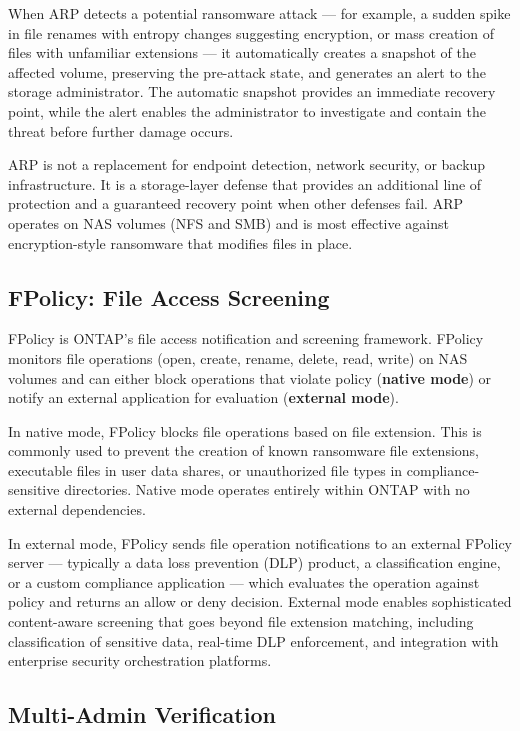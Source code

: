 \begin{securitybox}
When ARP detects a potential ransomware attack --- for example, a sudden spike in file renames with entropy changes suggesting encryption, or mass creation of files with unfamiliar extensions --- it automatically creates a snapshot of the affected volume, preserving the pre-attack state, and generates an alert to the storage administrator. The automatic snapshot provides an immediate recovery point, while the alert enables the administrator to investigate and contain the threat before further damage occurs.

ARP is not a replacement for endpoint detection, network security, or backup infrastructure. It is a storage-layer defense that provides an additional line of protection and a guaranteed recovery point when other defenses fail. ARP operates on NAS volumes (NFS and SMB) and is most effective against encryption-style ransomware that modifies files in place.

\subsection*{FPolicy: File Access Screening}

FPolicy is ONTAP's file access notification and screening framework. FPolicy monitors file operations (open, create, rename, delete, read, write) on NAS volumes and can either block operations that violate policy (\textbf{native mode}) or notify an external application for evaluation (\textbf{external mode}).

In native mode, FPolicy blocks file operations based on file extension. This is commonly used to prevent the creation of known ransomware file extensions, executable files in user data shares, or unauthorized file types in compliance-sensitive directories. Native mode operates entirely within ONTAP with no external dependencies.

In external mode, FPolicy sends file operation notifications to an external FPolicy server --- typically a data loss prevention (DLP) product, a classification engine, or a custom compliance application --- which evaluates the operation against policy and returns an allow or deny decision. External mode enables sophisticated content-aware screening that goes beyond file extension matching, including classification of sensitive data, real-time DLP enforcement, and integration with enterprise security orchestration platforms.

\subsection*{Multi-Admin Verification}


\end{securitybox}
